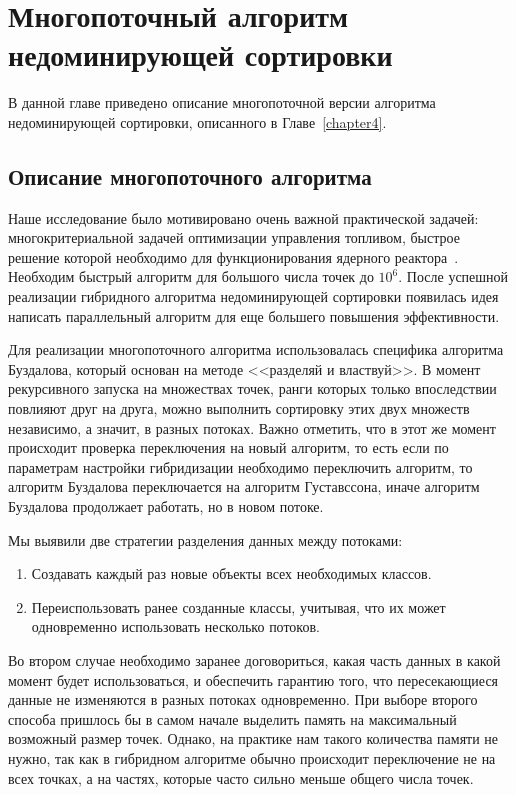 \chapter{Многопоточный алгоритм недоминирующей сортировки}
\label{chapter5}

В данной главе приведено описание многопоточной версии алгоритма недоминирующей сортировки, описанного в Главе~\ref{chapter4}.

\section{Описание многопоточного алгоритма}

Наше исследование было мотивировано очень важной практической задачей: многокритериальной задачей оптимизации управления топливом, быстрое решение которой необходимо для функционирования ядерного реактора~\cite{Schlunz}. Необходим быстрый алгоритм для большого числа точек до $10^6$. После успешной реализации гибридного алгоритма недоминирующей сортировки появилась идея написать параллельный алгоритм для еще большего повышения эффективности. 

Для реализации многопоточного алгоритма использовалась специфика алгоритма Буздалова, который основан на методе <<разделяй и властвуй>>.  В момент рекурсивного запуска на множествах точек, ранги которых только впоследствии повлияют друг на друга, можно выполнить сортировку этих двух множеств независимо, а значит, в разных потоках. Важно отметить, что в этот же момент происходит проверка переключения на новый алгоритм, то есть если по параметрам настройки гибридизации необходимо переключить алгоритм, то алгоритм Буздалова переключается на алгоритм Густавссона, иначе алгоритм Буздалова продолжает работать, но в новом потоке. 

Мы выявили две стратегии разделения данных между потоками:
\begin{enumerate}
    \item Создавать каждый раз новые объекты всех необходимых классов.
    \item Переиспользовать ранее созданные классы, учитывая, что их может одновременно использовать несколько потоков.
\end{enumerate}

Во втором случае необходимо заранее договориться, какая часть данных в какой момент будет использоваться, и обеспечить гарантию того, что пересекающиеся данные не изменяются в разных потоках одновременно. При выборе второго способа пришлось бы в самом начале выделить память на максимальный возможный размер точек. Однако, на практике нам такого количества памяти не нужно, так как в гибридном алгоритме обычно происходит переключение не на всех точках, а на частях, которые часто сильно меньше общего числа точек.

